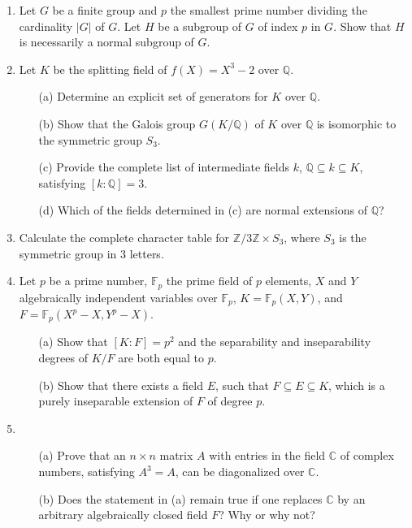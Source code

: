 \documentclass{article}
\begin{document}
\begin{enumerate}
    \item Let \(G\) be a finite group and \(p\) the smallest prime number dividing the cardinality \(|G|\) of \(G\). Let \(H\) be a subgroup of \(G\) of index \(p\) in \(G\). Show that \(H\) is necessarily a normal subgroup of \(G\).

    \item Let \(K\) be the splitting field of \(f(X)=X^3-2\) over \(\mathbb{Q}\).
    \begin{itemize}
        \item[(a)] Determine an explicit set of generators for \(K\) over \(\mathbb{Q}\).
        \item[(b)] Show that the Galois group \(G(K/\mathbb{Q})\) of \(K\) over \(\mathbb{Q}\) is isomorphic to the symmetric group \(S_3\).
        \item[(c)] Provide the complete list of intermediate fields \(k\), \(\mathbb{Q} \subseteq k \subseteq K\), satisfying \([k:\mathbb{Q}]=3\).
        \item[(d)] Which of the fields determined in (c) are normal extensions of \(\mathbb{Q}\)?
    \end{itemize}

    \item Calculate the complete character table for \(\mathbb{Z}/3\mathbb{Z} \times S_3\), where \(S_3\) is the symmetric group in 3 letters.

    \item Let \(p\) be a prime number, \(\mathbb{F}_p\) the prime field of \(p\) elements, \(X\) and \(Y\) algebraically independent variables over \(\mathbb{F}_p\), \(K=\mathbb{F}_p(X,Y)\), and \(F=\mathbb{F}_p(X^p-X,Y^p-X)\).
    \begin{itemize}
        \item[(a)] Show that \([K:F]=p^2\) and the separability and inseparability degrees of \(K/F\) are both equal to \(p\).
        \item[(b)] Show that there exists a field \(E\), such that \(F \subseteq E \subseteq K\), which is a purely inseparable extension of \(F\) of degree \(p\).
    \end{itemize}

    \item 
    \begin{itemize}
        \item[(a)] Prove that an \(n \times n\) matrix \(A\) with entries in the field \(\mathbb{C}\) of complex numbers, satisfying \(A^3=A\), can be diagonalized over \(\mathbb{C}\).
        \item[(b)] Does the statement in (a) remain true if one replaces \(\mathbb{C}\) by an arbitrary algebraically closed field \(F\)? Why or why not?
    \end{itemize}


\end{enumerate}
\end{document}

